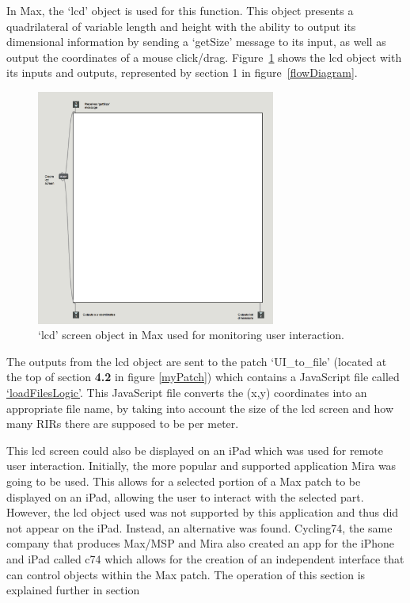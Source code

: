 \documentclass[../../main.tex]{subfiles}
\begin{document}
			In Max, the ‘lcd’ object is used for this function. This object presents a quadrilateral of variable length and height with the ability to output its dimensional information by sending a ‘getSize’ message to its input, as well as output the coordinates of a mouse click/drag. Figure~\ref{lcd} shows the lcd object with its inputs and outputs, represented by section 1 in figure~\ref{flowDiagram}.

			\begin{figure}[p]
				\centerline{\includegraphics[width=0.7\textwidth]{Sections/Implementation/Max/images/Max/lcd.png}}
				\caption{`lcd' screen object in Max used for monitoring user interaction.}
				\label{lcd}
			\end{figure}

			The outputs from the lcd object are sent to the patch ‘UI\_to\_file’ (located at the top of section \textbf{4.2} in figure \ref{myPatch}) which contains a JavaScript file called \href{http://lt669.github.io/code/javascript/html/loadFilesLogic.html}{‘loadFilesLogic’}. This JavaScript file converts the (x,y) coordinates into an appropriate file name, by taking into account the size of the lcd screen and how many RIRs there are supposed to be per meter.

			This lcd screen could also be displayed on an iPad which was used for remote user interaction. Initially, the more popular and supported application Mira \cite{mira} was going to be used. This allows for a selected portion of a Max patch to be displayed on an iPad, allowing the user to interact with the selected part. However, the lcd object used was not supported by this application and thus did not appear on the iPad. Instead, an alternative was found. Cycling74, the same company that produces Max/MSP and Mira also created an app for the iPhone and iPad called c74 \cite{c74} which allows for the creation of an independent interface that can control objects within the Max patch. The operation of this section is explained further in section 
\end{document}
